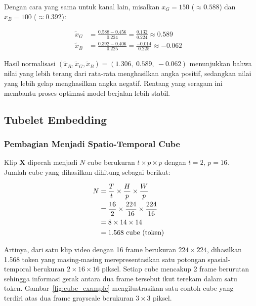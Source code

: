 \noindent
Dengan cara yang sama untuk kanal lain, misalkan $x_G = 150$
($\approx 0.588$) dan $x_B = 100$ ($\approx 0.392$):
 
\vspace{0.5cm}
\begin{align*}
  \tilde{x}_G
  &= \frac{0.588 - 0.456}{0.224}
   = \frac{0.132}{0.224}
   \approx 0.589 \\[4pt]
  \tilde{x}_B
  &= \frac{0.392 - 0.406}{0.225}
   = \frac{-0.014}{0.225}
   \approx -0.062
\end{align*}
\vspace{0.5cm}
 
\noindent
Hasil normalisasi $(\tilde{x}_R, \tilde{x}_G, \tilde{x}_B)
= (1.306,\; 0.589,\; -0.062)$ menunjukkan bahwa nilai yang lebih terang
dari rata-rata menghasilkan angka positif, sedangkan nilai yang lebih
gelap menghasilkan angka negatif. Rentang yang seragam ini membantu
proses optimasi model berjalan lebih stabil.

\subsection{Tubelet Embedding}

\subsubsection{Pembagian Menjadi Spatio-Temporal Cube}
 
Klip $\mathbf{X}$ dipecah menjadi $N$ cube berukuran
$t \times p \times p$ dengan $t=2$, $p=16$.
Jumlah cube yang dihasilkan dihitung sebagai berikut:
 
\vspace{0.5cm}
\begin{align}
  N &= \frac{T}{t}\times\frac{H}{p}\times\frac{W}{p} \notag \\
    &= \frac{16}{2}\times\frac{224}{16}\times\frac{224}{16} \notag \\
    &= 8 \times 14 \times 14 \notag \\
    &= 1{.}568 \text{ cube (token)}
\end{align}
\vspace{0.5cm}
 
\noindent
Artinya, dari satu klip video dengan 16 frame berukuran $224\times224$,
dihasilkan 1.568 token yang masing-masing merepresentasikan satu
potongan spasial-temporal berukuran $2\times16\times16$ piksel.
Setiap cube mencakup 2 frame berurutan sehingga informasi gerak
antara dua frame tersebut ikut terekam dalam satu token.
Gambar~\ref{fig:cube_example} mengilustrasikan satu contoh cube yang terdiri atas dua frame grayscale berukuran $3\times3$ piksel.\par

